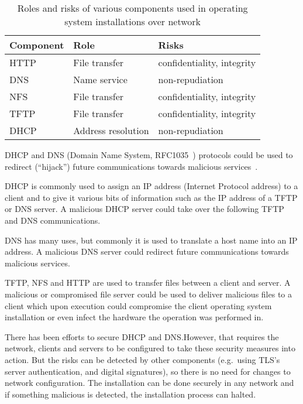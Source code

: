 \begin{table}[!ht]
  \def\arraystretch{1.1}%
  \begin{center}
    \caption{Roles and risks of various components used in operating
      system installations over network\label{tab:risks_table}}
    \begin{tabular}{| l | l | l |}
      \hline
      Component   & Role               & Risks                      \\
      \hline
      HTTP        & File transfer      & confidentiality, integrity \\
      DNS         & Name service       & non-repudiation            \\
      NFS         & File transfer      & confidentiality, integrity \\
      TFTP        & File transfer      & confidentiality, integrity \\
      DHCP        & Address resolution & non-repudiation            \\
      \hline
    \end{tabular}
  \end{center}
\end{table}


DHCP and DNS (Domain Name System, RFC1035~\cite{rfc1035}) protocols
could be used to redirect (``hijack'') future communications towards
malicious services~\cite{green2005dns}\cite{ornaghi2003man}.

DHCP is commonly used to assign an IP address (Internet Protocol
address) to a client and to give it various bits of information such
as the IP address of a TFTP or DNS server. A malicious DHCP server
could take over the following TFTP and DNS communications.

DNS has many uses, but commonly it is used to translate a host name
into an IP address. A malicious DNS server could redirect future
communications towards malicious services.

TFTP, NFS and HTTP are used to transfer files between a client and
server. A malicious or compromised file server could be used to
deliver malicious files to a client which upon execution could
compromise the client operating system installation or even infect the
hardware the operation was performed in.

There has been efforts to secure DHCP and DNS.\@ However, that
requires the network, clients and servers to be configured to take
these security measures into action. But the risks can be detected by
other components (e.g.\ using TLS's server authentication, and digital
signatures), so there is no need for changes to network
configuration. The installation can be done securely in any network
and if something malicious is detected, the installation process can
halted.

